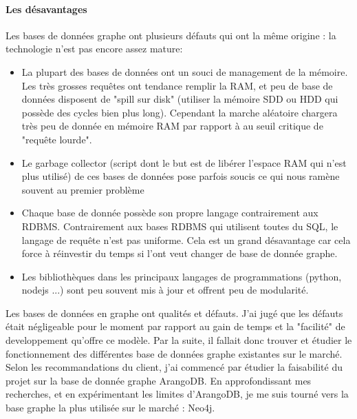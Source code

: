 \documentclass{article} %
\begin{document}
\paragraph{Les désavantages\\}
Les bases de données graphe ont plusieurs défauts qui ont la même origine : la technologie n'est pas encore assez mature:
\begin{itemize}
	\item La plupart des bases de données ont un souci de management de la mémoire. Les très grosses requêtes ont tendance remplir la RAM, et peu de base de données disposent de "spill sur disk" (utiliser la mémoire SDD ou HDD qui possède des cycles bien plus long). Cependant la marche aléatoire chargera très peu de donnée en mémoire RAM par rapport à au seuil critique de "requête lourde". 
	\item Le garbage collector (script dont le but est de libérer l'espace RAM qui n'est plus utilisé) de ces bases de données pose parfois soucis ce qui nous ramène souvent au premier problème
	\item Chaque base de donnée possède son propre langage contrairement aux RDBMS. Contrairement aux bases RDBMS qui utilisent toutes du SQL, le langage de requête n'est pas uniforme. Cela est un grand désavantage car cela force à réinvestir du temps si l'ont veut changer de base de donnée graphe.
	\item Les bibliothèques dans les principaux langages de programmations (python, nodejs ...) sont peu souvent mis à jour et offrent peu de modularité. 
\end{itemize}

Les bases de données en graphe ont qualités et défauts. J'ai jugé que les défauts était négligeable pour le moment par rapport au gain de temps et la "facilité" de developpement qu'offre ce modèle. Par la suite, il fallait donc trouver et étudier le fonctionnement des différentes base de données graphe existantes sur le marché. Selon les recommandations du client, j'ai commencé par étudier la faisabilité du projet sur la base de donnée graphe ArangoDB. En approfondissant mes recherches, et en expérimentant les limites d'ArangoDB, je me suis tourné vers la base graphe la plus utilisée sur le marché : Neo4j.
\end{document}
